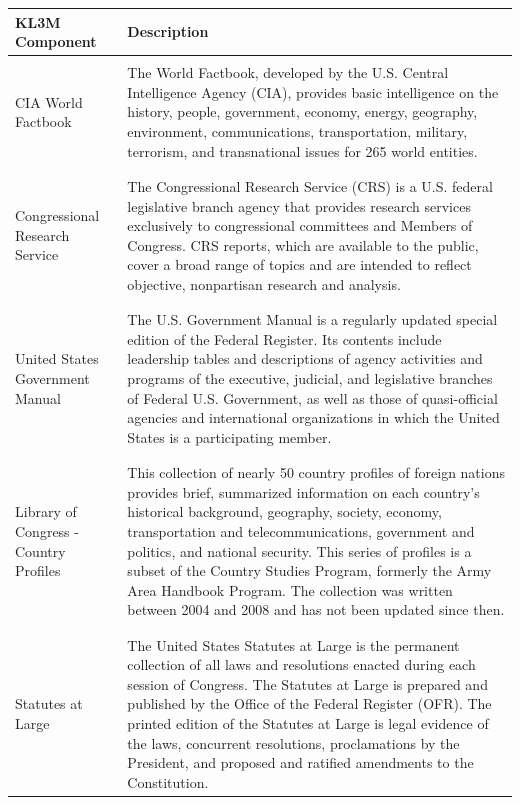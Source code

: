 \begin{table}[h]
\scriptsize
\begin{longtable}{ p{3cm} p{9cm} }
\textbf{KL3M Component}
& \textbf{Description}
\\\midrule
\\
CIA World Factbook &
The World Factbook, developed by the U.S. Central Intelligence Agency (CIA), provides basic intelligence on the history, people, government, economy, energy, geography, environment, communications, transportation, military, terrorism, and transnational issues for 265 world entities.
\\
 \\\hline
  \\
Congressional Research Service
& The Congressional Research Service (CRS) is a U.S. federal legislative branch agency that provides research services exclusively to congressional committees and Members of Congress. CRS reports, which are available to the public, cover a broad range of topics and are intended to reflect objective, nonpartisan research and analysis.
\\
 \\\hline
  \\
United States Government Manual &
The U.S. Government Manual is a regularly updated special edition of the Federal Register. Its contents include leadership tables and descriptions of agency activities and programs of the executive, judicial, and legislative branches of Federal U.S. Government, as well as those of quasi-official agencies and international organizations in which the United States is a participating member.
\\
 \\\hline
  \\
Library of Congress - Country Profiles &
This collection of nearly 50 country profiles of foreign nations provides brief, summarized information on each country’s historical background, geography, society, economy, transportation and telecommunications, government and politics, and national security. This series of profiles is a subset of the Country Studies Program, formerly the Army Area Handbook Program. The collection was written between 2004 and 2008 and has not been updated since then.
\\
 \\\hline
  \\
Statutes at Large &
The United States Statutes at Large is the permanent collection of all laws and resolutions enacted during each session of Congress. The Statutes at Large is prepared and published by the Office of the Federal Register (OFR). The printed edition of the Statutes at Large is legal evidence of the laws, concurrent resolutions, proclamations by the President, and proposed and ratified amendments to the Constitution.  \\

\end{longtable}
\end{table}

